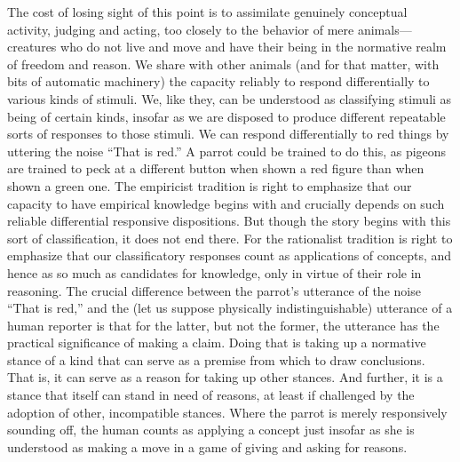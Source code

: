 The cost of losing sight of this point is to assimilate genuinely
conceptual activity, judging and acting, too closely to the behavior of
mere animals---creatures who do not live and move and have their being
in the normative realm of freedom and reason. We share with other
animals (and for that matter, with bits of automatic machinery) the
capacity reliably to respond differentially to various kinds of stimuli.
We, like they, can be understood as classifying stimuli as being of
certain kinds, insofar as we are disposed to produce different
repeatable sorts of responses to those stimuli. We can respond
differentially to red things by uttering the noise ``That is red.'' A
parrot could be trained to do this, as pigeons are trained to peck at a
different button when shown a red figure than when shown a green one.
The empiricist tradition is right to emphasize that our capacity to have
empirical knowledge begins with and crucially depends on such reliable
differential responsive dispositions. But though the story begins with
this sort of classification, it does not end there. For the rationalist
tradition is right to emphasize that our classificatory responses count
as applications of concepts, and hence as so much as candidates for
knowledge, only in virtue of their role in reasoning. The crucial
difference between the parrot's utterance of the noise ``That is red,''
and the (let us suppose physically indistinguishable) utterance of a
human reporter is that for the latter, but not the former, the utterance
has the practical significance of making a claim. Doing that is taking
up a normative stance of a kind that can serve as a premise from which
to draw conclusions. That is, it can serve as a reason for taking up
other stances. And further, it is a stance that itself can stand in need
of reasons, at least if challenged by the adoption of other,
incompatible stances. Where the parrot is merely responsively sounding
off, the human counts as applying a concept just insofar as she is
understood as making a move in a game of giving and asking for reasons.

